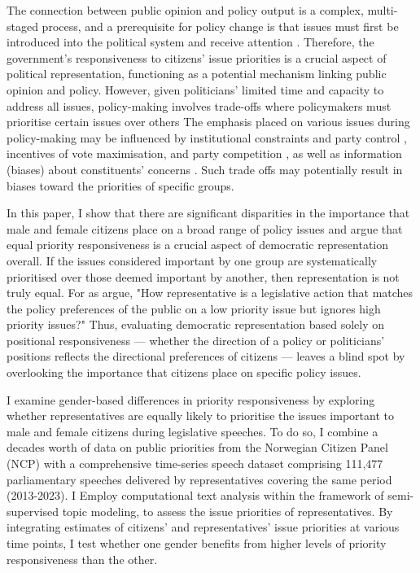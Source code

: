 The connection between public opinion and policy output is a complex, multi-staged process, and a prerequisite for policy change is that issues must first be introduced into the political system and receive attention \parencite{jones_representation_2004, jones_representation_2009}. Therefore, the government's responsiveness to citizens' issue priorities is a crucial aspect of political representation, functioning as a potential mechanism linking public opinion and policy. However, given politicians' limited time and capacity to address all issues, policy-making involves trade-offs where policymakers must prioritise certain issues over others \parencite{jones_agenda_2018} The emphasis placed on various issues during policy-making may be influenced by  institutional constraints and party control \parencite{slapin_introduction_2014}, incentives of vote maximisation, and party competition \parencite{hobolt_government_2008, abou-chadi_brahmin_2021}, as well as information (biases) about constituents' concerns \parencite{traber_social_2022}. Such trade offs may potentially result in biases toward the priorities of specific groups.

In this paper, I show that there are significant disparities in the importance that male and female citizens place on a broad range of policy issues and argue that equal priority responsiveness is a crucial aspect of democratic representation overall. If the issues considered important by one group are systematically prioritised over those deemed important by another, then representation is not truly equal. For as \textcite[2]{jones_representation_2004} argue, "How representative is a legislative action that matches the policy preferences of the public on a low priority issue but ignores high priority issues?" Thus, evaluating democratic representation based solely on positional responsiveness — whether the direction of a policy or politicians’ positions reflects the directional preferences of citizens — leaves a blind spot by overlooking the importance that citizens place on specific policy issues.

I examine gender-based differences in priority responsiveness by exploring whether representatives are equally likely to prioritise the issues important to male and female citizens during legislative speeches. To do so, I combine a decades worth of data on public priorities from the Norwegian Citizen Panel (NCP) \parencite{ivarsflaten_norwegian_2024} with a comprehensive time-series speech dataset comprising 111,477 parliamentary speeches delivered by representatives covering the same period (2013-2023). I Employ computational text analysis within the framework of semi-supervised topic modeling, to assess the issue priorities of representatives. By integrating estimates of citizens' and representatives' issue priorities at various time points, I test whether one gender benefits from higher levels of priority responsiveness than the other.

